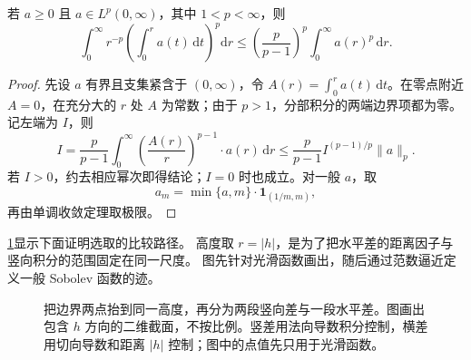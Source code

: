 \begin{lemma}[Hardy]\label{b1:lem:trace-hardy-inequality}
若 \(a\ge0\) 且 \(a\in L^p(0,\infty)\)，其中 \(1<p<\infty\)，则
\[
 \int_0^\infty r^{-p}\left(\int_0^r a(t)\,\mathrm dt\right)^p\mathrm dr
 \le\left(\frac p{p-1}\right)^p\int_0^\infty a(r)^p\,\mathrm dr.
\]
\end{lemma}
\begin{proof}
先设 \(a\) 有界且支集紧含于 \((0,\infty)\)，令 \(A(r)=\int_0^r a(t)\,\mathrm dt\)。在零点附近 \(A=0\)，在充分大的 \(r\) 处 \(A\) 为常数；由于 \(p>1\)，分部积分的两端边界项都为零。记左端为 \(I\)，则
\[
 I=\frac p{p-1}\int_0^\infty
       \left(\frac{A(r)}r\right)^{p-1}\cdot a(r)\,\mathrm dr
 \le\frac p{p-1}I^{(p-1)/p}\|a\|_p.
\]
若 \(I>0\)，约去相应幂次即得结论；\(I=0\) 时也成立。对一般 \(a\)，取
\[
 a_m=\min\{a,m\}\cdot\mathbf1_{(1/m,m)},
\]
再由单调收敛定理取极限。
\end{proof}

\cref{b1:fig:trace-three-leg-comparison}显示下面证明选取的比较路径。
高度取 \(r=|h|\)，是为了把水平差的距离因子与竖向积分的范围固定在同一尺度。
图先针对光滑函数画出，随后通过范数逼近定义一般 Sobolev 函数的迹。
\begin{figure}[htbp]
\centering
{}
\caption[半空间迹的三段比较]{把边界两点抬到同一高度，再分为两段竖向差与一段水平差。图画出包含 \(h\) 方向的二维截面，不按比例。竖差用法向导数积分控制，横差用切向导数和距离 \(|h|\) 控制；图中的点值先只用于光滑函数。}
\label{b1:fig:trace-three-leg-comparison}
\end{figure}

